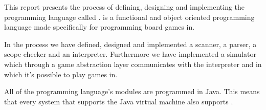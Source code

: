 This report presents the process of defining, designing and implementing the programming language called
\productname{}. \productname{} is a functional and object oriented programming language made specifically
for programming board games in. 

In the process we have defined, designed and implemented a scanner, a parser, 
a scope checker and an interpreter. Furthermore we have implemented a simulator which through a game 
abstraction layer communicates with the interpreter and in which it's possible to play \productname{} games in. 

All of the \productname{} programming language's modules are programmed in Java. This means that every system 
that supports the Java virtual machine also supports \productname{}.